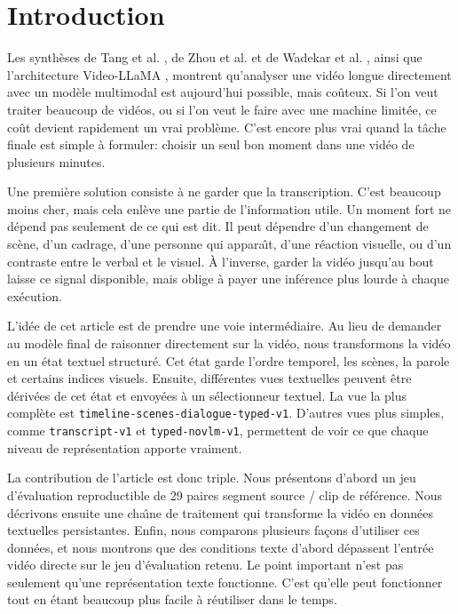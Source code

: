 \providecommand{\ArticleDataPrefix}{source/tableaux_et_figures}

\section{Introduction}

Les synth\`eses de Tang et al. \cite{tang2023}, de Zhou et al. \cite{zhou2024} et de Wadekar et al. \cite{wadekar2024_evolution_of_multimodal_model_architectures}, ainsi que l'architecture Video-LLaMA \cite{anonymous2023_videollama}, montrent qu'analyser une vid\'eo longue directement avec un mod\`ele multimodal est aujourd'hui possible, mais co\^uteux. Si l'on veut traiter beaucoup de vid\'eos, ou si l'on veut le faire avec une machine limit\'ee, ce co\^ut devient rapidement un vrai probl\`eme. C'est encore plus vrai quand la t\^ache finale est simple \`a formuler: choisir un seul bon moment dans une vid\'eo de plusieurs minutes.

Une premi\`ere solution consiste \`a ne garder que la transcription. C'est beaucoup moins cher, mais cela enl\`eve une partie de l'information utile. Un moment fort ne d\'epend pas seulement de ce qui est dit. Il peut d\'ependre d'un changement de sc\`ene, d'un cadrage, d'une personne qui appara\^\i t, d'une r\'eaction visuelle, ou d'un contraste entre le verbal et le visuel. \`A l'inverse, garder la vid\'eo jusqu'au bout laisse ce signal disponible, mais oblige \`a payer une inf\'erence plus lourde \`a chaque ex\'ecution.

L'id\'ee de cet article est de prendre une voie interm\'ediaire. Au lieu de demander au mod\`ele final de raisonner directement sur la vid\'eo, nous transformons la vid\'eo en un \'etat textuel structur\'e. Cet \'etat garde l'ordre temporel, les sc\`enes, la parole et certains indices visuels. Ensuite, diff\'erentes vues textuelles peuvent \^etre d\'eriv\'ees de cet \'etat et envoy\'ees \`a un s\'electionneur textuel. La vue la plus compl\`ete est \texttt{timeline-scenes-dialogue-typed-v1}. D'autres vues plus simples, comme \texttt{transcript-v1} et \texttt{typed-novlm-v1}, permettent de voir ce que chaque niveau de repr\'esentation apporte vraiment.

La contribution de l'article est donc triple. Nous pr\'esentons d'abord un jeu d'\'evaluation reproductible de 29 paires segment source / clip de r\'ef\'erence. Nous d\'ecrivons ensuite une cha\^\i ne de traitement qui transforme la vid\'eo en donn\'ees textuelles persistantes. Enfin, nous comparons plusieurs fa\c{c}ons d'utiliser ces donn\'ees, et nous montrons que des conditions texte d'abord d\'epassent l'entr\'ee vid\'eo directe sur le jeu d'\'evaluation retenu. Le point important n'est pas seulement qu'une repr\'esentation texte fonctionne. C'est qu'elle peut fonctionner tout en \'etant beaucoup plus facile \`a r\'eutiliser dans le temps.

